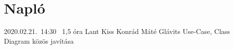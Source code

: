 %
\section{Napló}

\begin{naplo}

\bejegyzes
{2020.02.21.~14:30~} %
{1,5 óra} %
{Lant\newline
	Kiss\newline
	Konrád\newline
	Máté\newline
	Glávits
}{Use-Case, Class Diagram közös javítása} %


\end{naplo}

